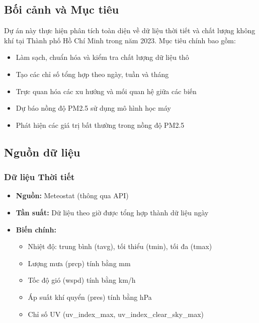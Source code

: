 \documentclass[12pt,a4paper]{article}
\begin{document}
\subsection{Bối cảnh và Mục tiêu}
Dự án này thực hiện phân tích toàn diện về dữ liệu thời tiết và chất lượng không khí tại Thành phố Hồ Chí Minh trong năm 2023. Mục tiêu chính bao gồm:

\begin{itemize}
    \item Làm sạch, chuẩn hóa và kiểm tra chất lượng dữ liệu thô
    \item Tạo các chỉ số tổng hợp theo ngày, tuần và tháng
    \item Trực quan hóa các xu hướng và mối quan hệ giữa các biến
    \item Dự báo nồng độ PM2.5 sử dụng mô hình học máy
    \item Phát hiện các giá trị bất thường trong nồng độ PM2.5
\end{itemize}

\subsection{Nguồn dữ liệu}

\subsubsection{Dữ liệu Thời tiết}
\begin{itemize}
    \item \textbf{Nguồn:} Meteostat (thông qua API)
    \item \textbf{Tần suất:} Dữ liệu theo giờ được tổng hợp thành dữ liệu ngày
    \item \textbf{Biến chính:}
    \begin{itemize}
        \item Nhiệt độ: trung bình (tavg), tối thiểu (tmin), tối đa (tmax)
        \item Lượng mưa (prcp) tính bằng mm
        \item Tốc độ gió (wspd) tính bằng km/h
        \item Áp suất khí quyển (pres) tính bằng hPa
        \item Chỉ số UV (uv\_index\_max, uv\_index\_clear\_sky\_max)
    \end{itemize}
\end{itemize}
\end{document}
